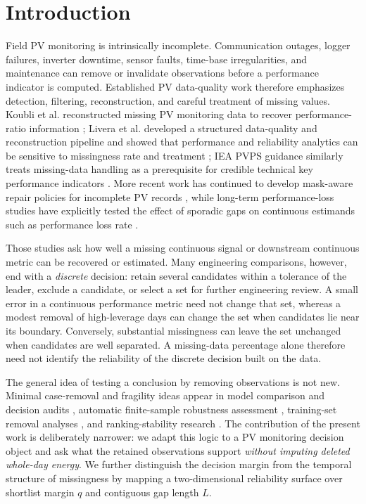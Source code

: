 \documentclass[preprint,12pt]{elsarticle}
\begin{document}
\section{Introduction}
Field PV monitoring is intrinsically incomplete. Communication outages, logger failures, inverter downtime, sensor faults, time-base irregularities, and maintenance can remove or invalidate observations before a performance indicator is computed. Established PV data-quality work therefore emphasizes detection, filtering, reconstruction, and careful treatment of missing values. Koubli et al. reconstructed missing PV monitoring data to recover performance-ratio information \cite{koubli2016}; Livera et al. developed a structured data-quality and reconstruction pipeline and showed that performance and reliability analytics can be sensitive to missingness rate and treatment \cite{livera2021}; IEA PVPS guidance similarly treats missing-data handling as a prerequisite for credible technical key performance indicators \cite{ieapvps2024}. More recent work has continued to develop mask-aware repair policies for incomplete PV records \cite{wang2026}, while long-term performance-loss studies have explicitly tested the effect of sporadic gaps on continuous estimands such as performance loss rate \cite{quest2025}.

Those studies ask how well a missing continuous signal or downstream continuous metric can be recovered or estimated. Many engineering comparisons, however, end with a \emph{discrete} decision: retain several candidates within a tolerance of the leader, exclude a candidate, or select a set for further engineering review. A small error in a continuous performance metric need not change that set, whereas a modest removal of high-leverage days can change the set when candidates lie near its boundary. Conversely, substantial missingness can leave the set unchanged when candidates are well separated. A missing-data percentage alone therefore need not identify the reliability of the discrete decision built on the data.

The general idea of testing a conclusion by removing observations is not new. Minimal case-removal and fragility ideas appear in model comparison and decision audits \cite{alzhrani2026}, automatic finite-sample robustness assessment \cite{giordano2026}, training-set removal analyses \cite{yang2023}, and ranking-stability research \cite{liang2025}. The contribution of the present work is deliberately narrower: we adapt this logic to a PV monitoring decision object and ask what the retained observations support \emph{without imputing deleted whole-day energy}. We further distinguish the decision margin from the temporal structure of missingness by mapping a two-dimensional reliability surface over shortlist margin $q$ and contiguous gap length $L$.
\end{document}
